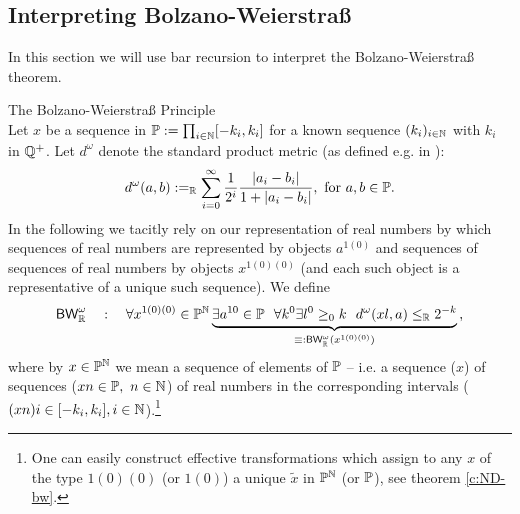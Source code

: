 \subsection{Interpreting Bolzano-Weierstra{\ss}} \label{ss:bw}
In this section we will use bar recursion
to interpret the Bolzano-Weierstra{\ss} theorem.
\begin{dfn}\label{d:BWfinal}
{The Bolzano-Weierstra{\ss} Principle}\\
Let $x$ be a sequence in $\mathbb{P}:=\prod_{i\in\mathbb{N}}[-k_i,k_i]$ for a known 
sequence $(k_i)_{i\in\mathbb{N}}$ with $k_i$ in $\mathbb{Q}^+$.
Let $d^\omega$ denote the standard product metric (as defined e.g. in 
\cite{Simpson99}):
\[
d^\omega (a,b):=_{\mathbb{R}}\sum_{i=0}^\infty 
\frac{1}{2^i}
\frac{|a_i-b_i|}{1+|a_i-b_i|},\text{ for } a,b\in\mathbb{P}.
\]
In the following we tacitly 
rely on our representation of real numbers by which 
sequences of real numbers are represented by objects $a^{1(0)}$ and sequences
of sequences of real numbers by objects $x^{1(0)(0)}$ (and 
each such object is a representative of a unique such sequence).
We define
\[
 \textsf{\upshape BW}^\omega_{\mathbb{R}}\quad:\quad
  \forall x^{1(0)(0)}\in\mathbb{P}^{\mathbb{N}}
      \underbrace{ 
         \exists a^{10}\in\mathbb{P}\ \ \forall k^0\exists l^0\geq_0 k
           \ \ d^\omega(xl,a)\leq_{\mathbb{R}} 2^{-k} 
      }_{\equiv:\textsf{\upshape BW}^\omega_{\mathbb{R}}(x^{1(0)(0)})}\text{,}
\]
where by $x\in\mathbb{P}^{\mathbb{N}}$ we mean a sequence of elements of $\mathbb{P}$ -- i.e. a 
sequence ($x$) of sequences ($xn\in\mathbb{P},\ n\in\mathbb{N}$) of real numbers in the
corresponding intervals ($(xn)i\in[-k_i,k_i], i\in\mathbb{N}$).\footnote{
One can easily construct effective transformations which assign to any $x$ 
of the type $1(0)(0)$ (or $1(0)$) a unique $\tilde x$ in $\mathbb{P}^{\mathbb{N}}$ 
(or $\mathbb{P}$), see theorem \ref{c:ND-bw}.}
\end{dfn}

